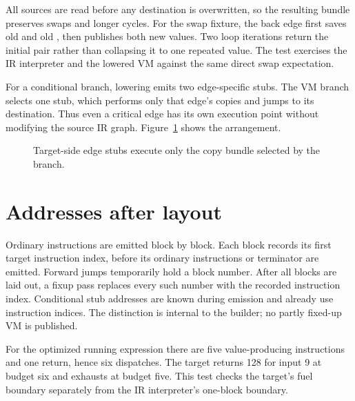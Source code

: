 All sources are read before any destination is overwritten, so the resulting bundle preserves swaps and longer cycles.
For the swap fixture, the back edge first saves old  and old , then publishes both new values.
Two loop iterations return the initial pair rather than collapsing it to one repeated value.
The test exercises the IR interpreter and the lowered VM against the same direct swap expectation.

For a conditional branch, lowering emits two edge-specific stubs.
The VM branch selects one stub, which performs only that edge's copies and jumps to its destination.
Thus even a critical edge has its own execution point without modifying the source IR graph.
Figure~\ref{fig:pebble-edge-stubs} shows the arrangement.

\begin{figure}[htbp]
\centering
{}
\caption{Target-side edge stubs execute only the copy bundle selected by the branch.}
\label{fig:pebble-edge-stubs}
\end{figure}

\section{Addresses after layout}
\label{sec:pebble-fixup}
Ordinary instructions are emitted block by block.
Each block records its first target instruction index, before its ordinary instructions or terminator are emitted.
Forward jumps temporarily hold a block number.
After all blocks are laid out, a fixup pass replaces every such number with the recorded instruction index.
Conditional stub addresses are known during emission and already use instruction indices.
The distinction is internal to the builder; no partly fixed-up VM is published.

For the optimized running expression there are five value-producing instructions and one return, hence six dispatches.
The target returns 128 for input 9 at budget six and exhausts at budget five.
This test checks the target's fuel boundary separately from the IR interpreter's one-block boundary.

